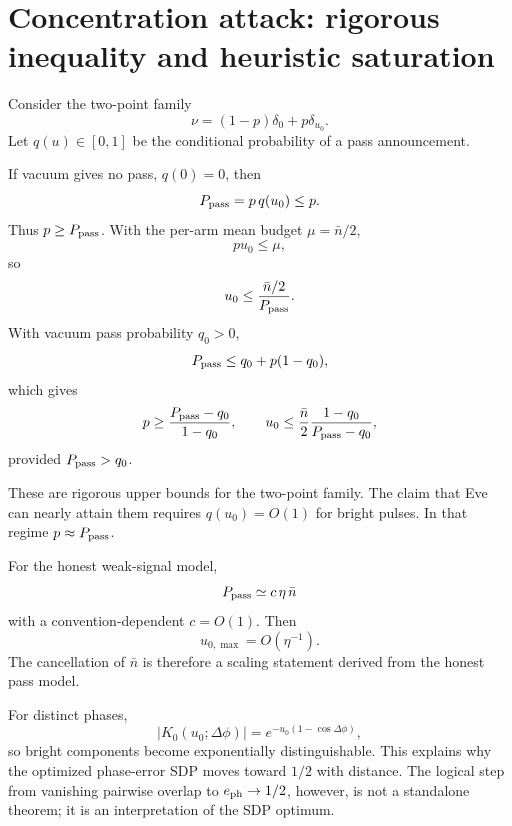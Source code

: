 \documentclass[11pt]{article}
\theoremstyle{remark}
\begin{document}
\section{Concentration attack: rigorous inequality and heuristic saturation}
\label{sec:concentration-rigorous}

Consider the two-point family
\begin{equation}
    \nu
    =
    (1-p)\delta_0+p\delta_{u_0}.
    \label{eq:stage3-concentration-family}
\end{equation}
Let \(q(u)\in[0,1]\) be the conditional probability of a pass announcement.

If vacuum gives no pass, \(q(0)=0\), then
\[
    P_{\rm pass}
    =
    p\,q(u_0)
    \le
    p.
\]
Thus \(p\ge P_{\rm pass}\). With the per-arm mean budget
\(\mu=\bar n/2\),
\[
    pu_0\le\mu,
\]
so
\begin{equation}
    u_0
    \le
    \frac{\bar n/2}{P_{\rm pass}}.
    \label{eq:stage3-concentration-exact}
\end{equation}
With vacuum pass probability \(q_0>0\),
\[
    P_{\rm pass}
    \le
    q_0+p(1-q_0),
\]
which gives
\begin{equation}
    p
    \ge
    \frac{P_{\rm pass}-q_0}{1-q_0},
    \qquad
    u_0
    \le
    \frac{\bar n}{2}
    \frac{1-q_0}{P_{\rm pass}-q_0},
    \label{eq:stage3-concentration-dark}
\end{equation}
provided \(P_{\rm pass}>q_0\).

These are rigorous upper bounds for the two-point family. The claim that Eve
can nearly attain them requires \(q(u_0)=O(1)\) for bright pulses. In that
regime \(p\approx P_{\rm pass}\).

For the honest weak-signal model,
\[
    P_{\rm pass}
    \simeq
    c\,\eta\,\bar n
\]
with a convention-dependent \(c=O(1)\). Then
\begin{equation}
    u_{0,\max}
    =
    O(\eta^{-1}).
    \label{eq:stage3-one-over-eta}
\end{equation}
The cancellation of \(\bar n\) is therefore a scaling statement derived from
the honest pass model.

For distinct phases,
\begin{equation}
    |K_0(u_0;\Delta\phi)|
    =
    e^{-u_0(1-\cos\Delta\phi)},
    \label{eq:stage3-bright-overlap}
\end{equation}
so bright components become exponentially distinguishable. This explains why
the optimized phase-error SDP moves toward \(1/2\) with distance. The logical
step from vanishing pairwise overlap to \(e_{\rm ph}\to1/2\), however, is not
a standalone theorem; it is an interpretation of the SDP optimum.
\end{document}
